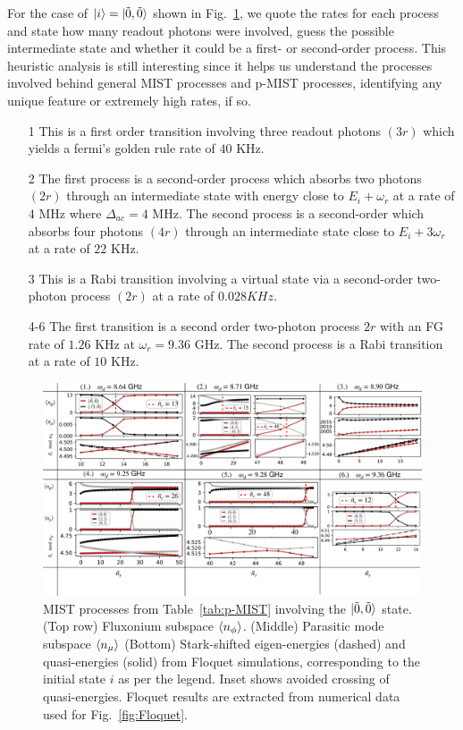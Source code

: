 \documentclass[%
reprint,
superscriptaddress,
 amsmath,amssymb,
 aps,
 prx,
longbibliography,
floatfix,
]{revtex4-2}
\begin{document}
For the case of $\ket{i}=\ket{\tilde{0},\tilde{0}}$ shown in Fig.~\ref{fig:Trans0}, we quote the rates for each process and state how many readout photons were involved, guess the possible intermediate state and whether it could be a first- or second-order process. This heuristic analysis is still interesting since it helps us understand the processes involved behind general MIST processes and p-MIST processes, identifying any unique feature or extremely high rates, if so. 
\begin{itemize}
    \item[1] This is a first order transition involving three readout photons $(3r)$ which yields a fermi's golden rule rate of $40$ KHz. 
    \item[2] The first process is a second-order process which absorbs two photons $(2r)$ through an intermediate state with energy close to $E_i+\omega_r$ at a rate of $4$ MHz where $\Delta_{ac}=4$ MHz. The second process is a second-order which absorbs four photons $(4r)$ through an intermediate state close to $E_i+3\omega_r$ at a rate of $22$ KHz. 
    \item[3] This is a Rabi transition involving a virtual state via a second-order two-photon process $(2r)$ at a rate of $0.028 KHz$. 
    \item[4-6] The first transition is a second order two-photon process $2r$ with an FG rate of $1.26$ KHz at $\omega_r=9.36$ GHz. The second process is a Rabi transition at a rate of $10$ KHz. 
\end{itemize} 
\begin{figure}
    \centering
    \includegraphics[width=1.0\textwidth]{Figures/Trans0.pdf}
    \caption{MIST processes from Table~\ref{tab:p-MIST} involving the $\ket{\tilde{0},\tilde{0}}$ state. (Top row) Fluxonium subspace $\braket{n_\phi}$. (Middle) Parasitic mode subspace $\braket{n_\mu}$ (Bottom) Stark-shifted eigen-energies (dashed) and quasi-energies (solid) from Floquet simulations, corresponding to the initial state $i$ as per the legend. Inset shows avoided crossing of quasi-energies. Floquet results are extracted from numerical data used for Fig.~\ref{fig:Floquet}.}
    \label{fig:Trans0}
\end{figure}
\end{document}
